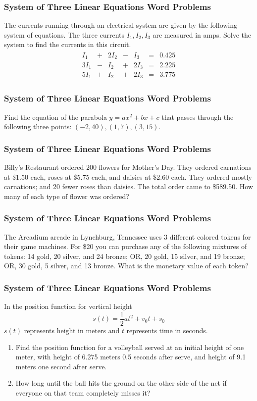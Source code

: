 \documentclass[xcolor=dvipsnames]{beamer}
\begin{document}
\begin{frame}
  \frametitle{System of Three Linear Equations Word Problems}
  {\ubung} The currents running through an electrical system are given
  by the following system of equations. The three currents $I_{1},I_{2},I_{3}$
  are measured in amps. Solve the system to find the currents in this
  circuit.
  \begin{align}
    \label{eq:oemeyeib}
    \begin{array}{clclclc}
    I_{1} & + & 2I_{2} & - & I_{3} & = & 0.425 \\
    3I_{1} & - & I_{2} & + & 2I_{3} & = & 2.225 \\
    5I_{1} & + & I_{2} & + & 2I_{3} & = & 3.775
    \end{array}
  \end{align}
\end{frame}

\begin{frame}
  \frametitle{System of Three Linear Equations Word Problems}
  {\ubung} Find the equation of the parabola $y=ax^{2}+bx+c$ that
  passes through the following three points: $(-2,40),(1,7),(3,15)$.
\end{frame}

\begin{frame}
  \frametitle{System of Three Linear Equations Word Problems}
  {\ubung} Billy's Restaurant ordered 200 flowers for Mother's Day.
  They ordered carnations at \$1.50 each, roses at \$5.75 each, and
  daisies at \$2.60 each. They ordered mostly carnations; and 20 fewer
  roses than daisies. The total order came to \$589.50. How many of
  each type of flower was ordered?
\end{frame}

\begin{frame}
  \frametitle{System of Three Linear Equations Word Problems}
  {\ubung} The Arcadium arcade in Lynchburg, Tennessee uses 3
  different colored tokens for their game machines. For \$20 you can
  purchase any of the following mixtures of tokens: 14 gold, 20
  silver, and 24 bronze; OR, 20 gold, 15 silver, and 19 bronze; OR, 30
  gold, 5 silver, and 13 bronze. What is the monetary value of each
  token?
\end{frame}

\begin{frame}
  \frametitle{System of Three Linear Equations Word Problems}
  {\ubung} In the position function for vertical height
  \begin{equation}
    \label{eq:eicheuth}
    s(t)=\frac{1}{2}at^{2}+v_{0}t+s_{0}
  \end{equation}
  $s(t)$ represents height in meters and $t$ represents time in
  seconds.
  \begin{enumerate}
  \item Find the position function for a volleyball served at an
    initial height of one meter, with height of 6.275 meters 0.5
    seconds after serve, and height of 9.1 meters one second after
    serve.
  \item How long until the ball hits the ground on the other side of
    the net if everyone on that team completely misses it?
  \end{enumerate}
\end{frame}
\end{document}
